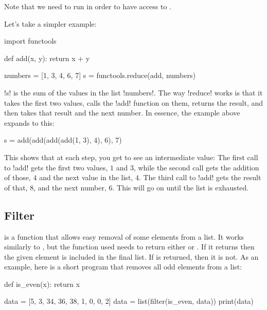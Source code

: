 \documentclass[11pt]{cselabheader}
\begin{document}
Note that we need to run  in order to have access to
.

Let's take a simpler example:
\begin{python3code}
import functools

def add(x, y):
  return x + y

numbers = [1, 3, 4, 6, 7]
s = functools.reduce(add, numbers)
\end{python3code}

\pythoninline!s! is the sum of the values in the list \pythoninline!numbers!. The way
\pythoninline!reduce! works is that it takes the first two values, calls the
\pythoninline!add! function on them, returns the result, and then takes that result
and the next number. In essence, the example above expands to this:
\begin{python3code}
s = add(add(add(add(1, 3), 4), 6), 7)
\end{python3code}

This shows that at each step, you get to see an intermediate value: The first
call to \pythoninline!add! gets the first two values, $1$ and $3$, while the second
call gets the addition of those, $4$ and the next value in the list, $4$. The
third call to \pythoninline!add! gets the result of that, $8$, and the next number,
$6$. This will go on until the list is exhausted.

\subsection{Filter}
\label{subsec:filter}
 is a function that allows easy removal of some elements from
a list. It works similarly to , but the function used needs to
return either  or . If it returns
 then the given element is included in the final list. If
 is returned, then it is not. As an example, here is a short
program that removes all odd elements from a list:

\begin{python3code}
def is_even(x):
    return x %

data = [5, 3, 34, 36, 38, 1, 0, 0, 2]
data = list(filter(is_even, data))
print(data)
\end{python3code}

\begin{verbatimcode}
[34, 36, 38, 0, 0, 2]
\end{verbatimcode}
\end{document}
